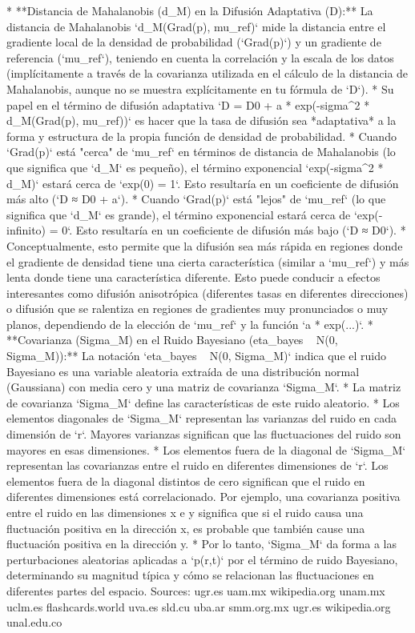 \documentclass{book}
\begin{document}
*   **Distancia de Mahalanobis (d_M) en la Difusión Adaptativa (D):** La distancia de Mahalanobis `d_M(Grad(p), mu_ref)` mide la distancia entre el gradiente local de la densidad de probabilidad (`Grad(p)`) y un gradiente de referencia (`mu_ref`), teniendo en cuenta la correlación y la escala de los datos (implícitamente a través de la covarianza utilizada en el cálculo de la distancia de Mahalanobis, aunque no se muestra explícitamente en tu fórmula de `D`).
    *   Su papel en el término de difusión adaptativa `D = D0 + a * exp(-sigma^2 * d_M(Grad(p), mu_ref))` es hacer que la tasa de difusión sea *adaptativa* a la forma y estructura de la propia función de densidad de probabilidad.
    *   Cuando `Grad(p)` está "cerca" de `mu_ref` en términos de distancia de Mahalanobis (lo que significa que `d_M` es pequeño), el término exponencial `exp(-sigma^2 * d_M)` estará cerca de `exp(0) = 1`. Esto resultaría en un coeficiente de difusión más alto (`D ≈ D0 + a`).
    *   Cuando `Grad(p)` está "lejos" de `mu_ref` (lo que significa que `d_M` es grande), el término exponencial estará cerca de `exp(-infinito) = 0`. Esto resultaría en un coeficiente de difusión más bajo (`D ≈ D0`).
    *   Conceptualmente, esto permite que la difusión sea más rápida en regiones donde el gradiente de densidad tiene una cierta característica (similar a `mu_ref`) y más lenta donde tiene una característica diferente. Esto puede conducir a efectos interesantes como difusión anisotrópica (diferentes tasas en diferentes direcciones) o difusión que se ralentiza en regiones de gradientes muy pronunciados o muy planos, dependiendo de la elección de `mu_ref` y la función `a * exp(...)`.
*   **Covarianza (Sigma_M) en el Ruido Bayesiano (eta_bayes ~ N(0, Sigma_M)):** La notación `eta_bayes ~ N(0, Sigma_M)` indica que el ruido Bayesiano es una variable aleatoria extraída de una distribución normal (Gaussiana) con media cero y una matriz de covarianza `Sigma_M`.
    *   La matriz de covarianza `Sigma_M` define las características de este ruido aleatorio.
    *   Los elementos diagonales de `Sigma_M` representan las varianzas del ruido en cada dimensión de `r`. Mayores varianzas significan que las fluctuaciones del ruido son mayores en esas dimensiones.
    *   Los elementos fuera de la diagonal de `Sigma_M` representan las covarianzas entre el ruido en diferentes dimensiones de `r`. Los elementos fuera de la diagonal distintos de cero significan que el ruido en diferentes dimensiones está correlacionado. Por ejemplo, una covarianza positiva entre el ruido en las dimensiones x e y significa que si el ruido causa una fluctuación positiva en la dirección x, es probable que también cause una fluctuación positiva en la dirección y.
    *   Por lo tanto, `Sigma_M` da forma a las perturbaciones aleatorias aplicadas a `p(r,t)` por el término de ruido Bayesiano, determinando su magnitud típica y cómo se relacionan las fluctuaciones en diferentes partes del espacio.
Sources:
ugr.es
uam.mx
wikipedia.org
unam.mx
uclm.es
flashcards.world
uva.es
sld.cu
uba.ar
smm.org.mx
ugr.es
wikipedia.org
unal.edu.co
\end{document}
